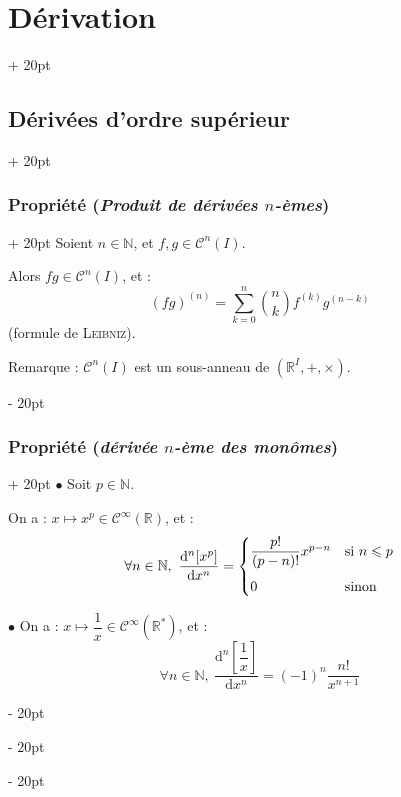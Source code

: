 \documentclass[a4paper, 12pt, twoside]{article}
\newcommand{\N}{\mathbb{N}} %
\newcommand{\R}{\mathbb{R}} %
\renewcommand{\le}{\leqslant}
\newcommand{\ind}[1][20pt]{\advance\leftskip + #1}
\newcommand{\deind}[1][20pt]{\advance\leftskip - #1}
\newenvironment{indt}[2][20pt]{#2 \par \ind[#1]}{\par \deind} %
\begin{document}
\begin{indt}{\section{Dérivation}}
\begin{indt}{\subsection{Dérivées d'ordre supérieur}}
            \vspace{12pt}
            
            \begin{indt}{\subsubsection{Propriété (\textit{Produit de dérivées $n$-èmes})}}
                Soient $n \in \N$, et $f, g \in \mathcal C^n(I)$.

                Alors $fg \in \mathcal C^n(I)$, et :
                \[
                    (fg)^{(n)} =
                    \sum_{k = 0}^n \binom n k f^{(k)} g^{(n - k)}
                \]
                (formule de \textsc{Leibniz}).

                \vspace{12pt}
                
                Remarque : $\mathcal C^n(I)$ est un sous-anneau de $(\R^I, +, \times)$.
            \end{indt}

            \vspace{12pt}
            
            \begin{indt}{\subsubsection{Propriété (\textit{dérivée $n$-ème des monômes})}}
                $\bullet$ Soit $p \in \N$.

                On a :
                $x \longmapsto x^p \in \mathcal C^\infty(\R)$, et :
                \[
                    \forall n \in \N,\
                    \dfrac{\mathrm d^n \! \left[ x^p \right]}{\mathrm dx^n} =
                    \begin{cases}
                        \dfrac{p!}{(p - n)!}x^{p - n}
                        & \text{si}\ n \le p
                        \vspace{6pt}
                        \\
                        0 & \text{sinon}
                    \end{cases}
                \]

                \vspace{12pt}
                
                $\bullet$ On a : $x \longmapsto \dfrac 1 x \in \mathcal C^\infty(\R^*)$, et :
                \[
                    \forall n \in \N,\
                    \dfrac{\mathrm d^n \! \left[ \dfrac 1 x \right]}{\mathrm dx^n} =
                    (-1)^n \dfrac{n!}{x^{n + 1}}
                \]
            \end{indt}
        \end{indt}


\end{indt}
\end{document}
